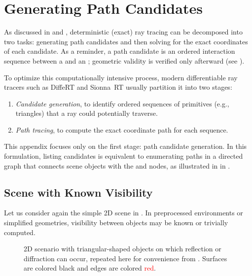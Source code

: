 \chapter{Generating Path Candidates}

As discussed in  and , deterministic (exact) ray tracing can be decomposed into two tasks: generating path candidates and then solving for the exact coordinates of each candidate. As a reminder, a path candidate is an ordered interaction sequence between a  and an ; geometric validity is verified only afterward (see ).

To optimize this computationally intensive process, modern differentiable ray tracers such as DiffeRT and Sionna~RT usually partition it into two stages:
\begin{enumerate}
  \item \emph{Candidate generation}, to identify ordered sequences of primitives (e.g., triangles) that a ray could potentially traverse.
  \item \emph{Path tracing}, to compute the exact coordinate path for each sequence.
\end{enumerate}

This appendix focuses only on the first stage: path candidate generation. In this formulation, listing candidates is equivalent to enumerating paths in a directed graph that connects scene objects with the  and  nodes, as illustrated in  in .

\section{Scene with Known Visibility}

Let us consider again the simple 2D scene in . In preprocessed environments or simplified geometries, visibility between objects may be known or trivially computed.

\begin{figure}[htpb]
  \centering
  \caption{2D scenario with triangular-shaped objects on which reflection or diffraction can occur, repeated here for convenience from . Surfaces are colored black and edges are colored \textcolor{red}{red}.}
\end{figure}


